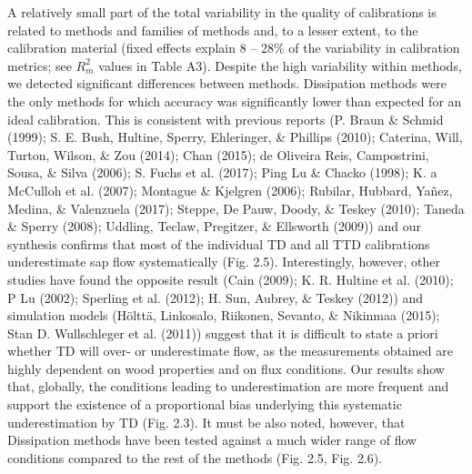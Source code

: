\documentclass[11pt,twoside]{reedthesis}
\begin{document}
A relatively small part of the total variability in the quality of
calibrations is related to methods and families of methods and, to a
lesser extent, to the calibration material (fixed effects explain 8 --
28\% of the variability in calibration metrics; see \(R^2_m\) values in
Table A3). Despite the high variability within methods, we detected
significant differences between methods. Dissipation methods were the
only methods for which accuracy was significantly lower than expected
for an ideal calibration. This is consistent with previous reports (P.
Braun \& Schmid (1999); S. E. Bush, Hultine, Sperry, Ehleringer, \&
Phillips (2010); Caterina, Will, Turton, Wilson, \& Zou (2014); Chan
(2015); de Oliveira Reis, Campostrini, Sousa, \& Silva (2006); S. Fuchs
et al. (2017); Ping Lu \& Chacko (1998); K. a McCulloh et al. (2007);
Montague \& Kjelgren (2006); Rubilar, Hubbard, Yañez, Medina, \&
Valenzuela (2017); Steppe, De Pauw, Doody, \& Teskey (2010); Taneda \&
Sperry (2008); Uddling, Teclaw, Pregitzer, \& Ellsworth (2009)) and our
synthesis confirms that most of the individual TD and all TTD
calibrations underestimate sap flow systematically (Fig. 2.5).
Interestingly, however, other studies have found the opposite result
(Cain (2009); K. R. Hultine et al. (2010); P Lu (2002); Sperling et al.
(2012); H. Sun, Aubrey, \& Teskey (2012)) and simulation models (Hölttä,
Linkosalo, Riikonen, Sevanto, \& Nikinmaa (2015); Stan D. Wullschleger
et al. (2011)) suggest that it is difficult to state a priori whether TD
will over- or underestimate flow, as the measurements obtained are
highly dependent on wood properties and on flux conditions. Our results
show that, globally, the conditions leading to underestimation are more
frequent and support the existence of a proportional bias underlying
this systematic underestimation by TD (Fig. 2.3). It must be also noted,
however, that Dissipation methods have been tested against a much wider
range of flow conditions compared to the rest of the methods (Fig. 2.5,
Fig. 2.6).\par
\end{document}
